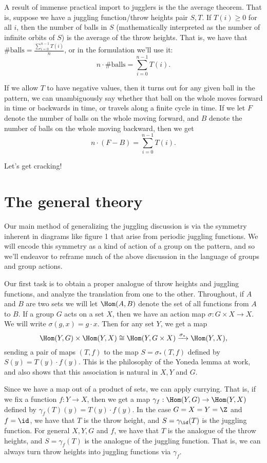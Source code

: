 \documentclass[12nt]{article}
\theoremstyle{plain}
\begin{document}
A result of immense practical import to jugglers is the the average theorem. That is, suppose we have a juggling function/throw heights pair $S, T$. If $T(i) \geq 0$ for all $i$, then the number of balls in $S$ (mathematically interpreted as the number of infinite orbits of $S$) is the average of the throw heights. That is, we have that $\# \text{balls} = \frac{\sum \limits_{i = 0}^{n-1} T(i)}{n} $, or in the formulation we'll use it:
\[
n \cdot \# \text{balls} = \sum \limits_{i=0}^{n-1} T(i).
\]

If we allow $T$ to have negative values, then it turns out for any given ball in the pattern, we can unambiguously say whether that ball on the whole moves forward in time or backwards in time, or travels along a finite cycle in time. If we let $F$ denote the number of balls on the whole moving forward, and $B$ denote the number of balls on the whole moving backward, then we get
\[
n \cdot (F - B) = \sum \limits_{i=0}^{n-1} T(i).
\]

Let's get cracking!

\section{The general theory}
Our main method of generalizing the juggling discussion is via the symmetry inherent in diagrams like figure 1 that arise from periodic juggling functions. We will encode this symmetry as a kind of action of a group on the pattern, and so we'll endeavor to reframe much of the above discussion in the language of groups and group actions.

Our first task is to obtain a proper analogue of throw heights and juggling functions, and analyze the translation from one to the other. Throughout, if $A$ and $B$ are two sets we will let $\Hom(A, B)$ denote the set of all functions from $A$ to $B$. If a group $G$ acts on a set $X$, then we have an action map $\sigma : G \times X \to X$. We will write $\sigma(g, x) = g \cdot x$. Then for any set $Y$, we get a map
\[
\Hom(Y, G) \times \Hom(Y, X) \cong \Hom(Y, G \times X) \xrightarrow{\sigma_*} \Hom(Y, X),
\] sending a pair of maps $(T, f)$ to the map $S = \sigma_*(T, f)$ defined by $S(y) = T(y) \cdot f(y)$. This is the philosophy of the Yoneda lemma at work, and also shows that this association is natural in $X, Y$ and $G$. 

Since we have a map out of a product of sets, we can apply currying. That is, if we fix a function $f : Y \to X$, then we get a map $\gamma_f : \Hom(Y, G) \to \Hom(Y, X)$ defined by $\gamma_f(T)(y) = T(y) \cdot f(y)$. In the case $G = X = Y = \Z$ and $f = \id$, we have that $T$ is the throw height, and $S = \gamma_{\id}(T)$ is the juggling function. For general $X, Y, G$ and $f$, we have that $T$ is the analogue of the throw heights, and $S = \gamma_f(T)$ is the analogue of the juggling function. That is, we can always turn throw heights into juggling functions via $\gamma_f$. 
\end{document}
